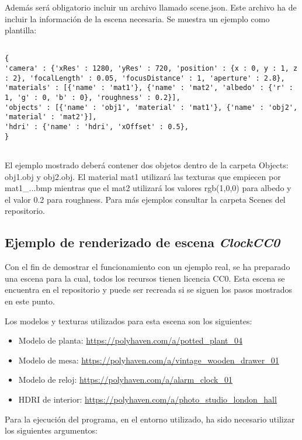 Además será obligatorio incluir un archivo llamado scene.json. Este archivo ha de incluir la información de la escena necesaria. Se muestra un ejemplo como plantilla:

\begin{lstlisting}
	
{	
'camera' : {'xRes' : 1280, 'yRes' : 720, 'position' : {x : 0, y : 1, z : 2}, 'focalLength' : 0.05, 'focusDistance' : 1, 'aperture' : 2.8},
'materials' : [{'name' : 'mat1'}, {'name' : 'mat2', 'albedo' : {'r' : 1, 'g' : 0, 'b' : 0}, 'roughness' : 0.2}],
'objects' : [{'name' : 'obj1', 'material' : 'mat1'}, {'name' : 'obj2', 'material' : 'mat2'}],
'hdri' : {'name' : 'hdri', 'xOffset' : 0.5},
}
	
\end{lstlisting}

El ejemplo mostrado deberá contener dos objetos dentro de la carpeta Objects: obj1.obj y obj2.obj. El material mat1 utilizará las texturas que empiecen por mat1\_...bmp mientras que el mat2 utilizará los valores rgb(1,0,0) para albedo y el valor 0.2 para roughness. Para más ejemplos consultar la carpeta Scenes del repositorio.

\subsection{Ejemplo de renderizado de escena \emph{ClockCC0}}

Con el fin de demostrar el funcionamiento con un ejemplo real, se ha preparado una escena para la cual, todos los recursos tienen licencia CC0. Esta escena se encuentra en el repositorio y puede ser recreada si se siguen los pasos mostrados en este punto.

Los modelos y texturas utilizados para esta escena son los siguientes:

\begin{itemize}
	\item Modelo de planta: \url{https://polyhaven.com/a/potted_plant_04}
	\item Modelo de mesa: \url{https://polyhaven.com/a/vintage_wooden_drawer_01}
	\item Modelo de reloj: \url{https://polyhaven.com/a/alarm_clock_01}
	\item HDRI de interior: \url{https://polyhaven.com/a/photo_studio_london_hall}
\end{itemize}

Para la ejecución del programa, en el entorno utilizado, ha sido necesario utilizar los siguientes argumentos:

